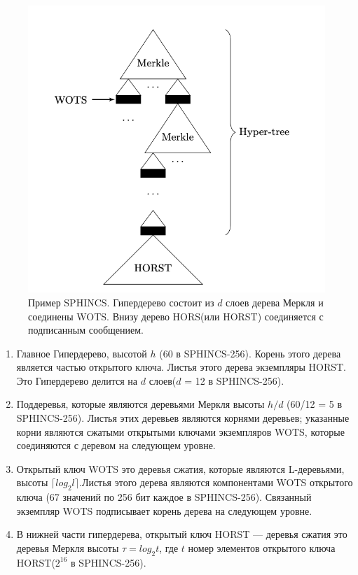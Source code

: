 \documentclass[a4paper, 14pt]{extarticle}
\begin{document}
\begin{figure}[h]
    \centering
    \includegraphics[scale=1]{SPHINCS.png}
    \caption{Пример SPHINCS. Гипердерево состоит из $d$ слоев дерева Меркля и соединены WOTS. Внизу дерево HORS(или HORST) соединяется с подписанным сообщением.}
    \label{fig:SPHINCS}
\end{figure}

\begin{enumerate}
    \item Главное Гипердерево, высотой $h$ (60 в SPHINCS-256). Корень этого дерева является частью открытого ключа. Листья этого дерева экземпляры HORST. Это Гипердерево делится на $d$ слоев($d$ = 12 в SPHINCS-256).
    \item Поддеревья, которые являются деревьями Меркля высоты $h/d$ (60/12 = 5 в SPHINCS-256). Листья этих деревьев являются корнями деревьев; указанные корни являются сжатыми открытыми ключами экземпляров WOTS, которые соединяются с деревом на следующем уровне.
    \item Открытый ключ WOTS это деревья сжатия, которые являются \newline L-деревьями, высоты $\lceil log_{2}l \rceil$.Листья этого дерева являются компонентами WOTS открытого ключа (67 значений по 256 бит каждое в SPHINCS-256). Связанный экземпляр WOTS подписывает корень дерева на следующем уровне.
    \item В нижней части гипердерева, открытый ключ HORST --- деревья сжатия это деревья Меркля высоты $\tau = log_{2}t$, где $t$ номер элементов открытого ключа HORST($2^{16}$ в SPHINCS-256).
\end{enumerate}
\end{document}
